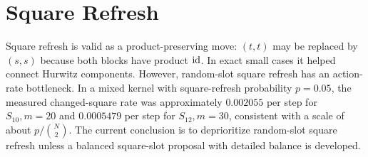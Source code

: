 \section{Square Refresh}

Square refresh is valid as a product-preserving move: $(t,t)$ may be replaced
by $(s,s)$ because both blocks have product $\mathrm{id}$.  In exact small cases it
helped connect Hurwitz components.  However, random-slot square refresh has an
action-rate bottleneck.  In a mixed kernel with square-refresh probability
$p=0.05$, the measured changed-square rate was approximately $0.002055$ per
step for $S_{10},m=20$ and $0.0005479$ per step for $S_{12},m=30$, consistent
with a scale of about $p/\binom{N}{2}$.  The current conclusion is to
deprioritize random-slot square refresh unless a balanced square-slot proposal
with detailed balance is developed.
